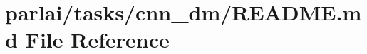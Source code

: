 \hypertarget{parlai_2tasks_2cnn__dm_2README_8md}{}\section{parlai/tasks/cnn\+\_\+dm/\+R\+E\+A\+D\+ME.md File Reference}
\label{parlai_2tasks_2cnn__dm_2README_8md}
